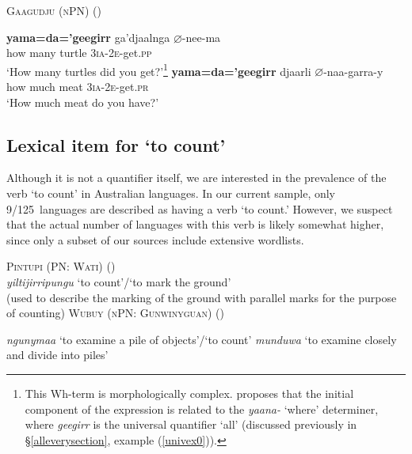 \documentclass[12pt,egregdoesnotlikesansseriftitles]{scrartcl}
\makeatletter
\newcommand{\ofy}{/125} %
\makeatother
\begin{document}
\begin{exe}
 \ex \textsc{Gaagudju (nPN)} \hfill (\citealt[232]{harvey92})
 \begin{xlist}
\ex \gll \textbf{yama=da='geegirr} ga'djaalnga $\varnothing$-nee-ma\\
 {how many} turtle 3\textsc{ia}-2\textsc{e}-get.\textsc{pp} \\
 `How many turtles did you get?'\footnote{This Wh-term is morphologically complex. \citet[232]{harvey92} proposes that the initial component of the expression is related to the \textit{yaana-} `where' determiner, where \textit{geegirr} is the universal quantifier `all' (discussed previously in \S\ref{alleverysection}, example (\ref{univex0})).}
\ex \gll \textbf{yama=da='geegirr} djaarli $\varnothing$-naa-garra-y\\
{how much} meat 3\textsc{ia}-2\textsc{e}-get.\textsc{pr} \\
`How much meat do you have?' %
\end{xlist}
\end{exe}


\subsection{Lexical item for `to count'}


Although it is not a quantifier itself, we are interested in the prevalence of the verb `to count' in Australian languages. In our current sample, only 9\ofy \ languages are described as having a verb `to count.' However, we suspect that the actual number of languages with this verb is likely somewhat higher, since only a subset of our sources include extensive wordlists.


\begin{exe}
  \ex \textsc{Pintupi (PN: Wati)} \hfill (\citealt[179]{pintupi77})\\
  \textit{yiltijirripungu} `to count'/`to mark the ground'\\
  (used to describe the marking of the ground with parallel marks for the purpose of counting)
  \ex \textsc{Wubuy (nPN: Gunwinyguan)} \hfill (\citealt{nuydict})
  \begin{xlist}
     \ex \textit{ngunymaa} `to examine a pile of objects'/`to count'
    \ex \textit{munduwa} `to examine closely and divide into piles' 
  \end{xlist}
\end{exe} 
\end{document}
